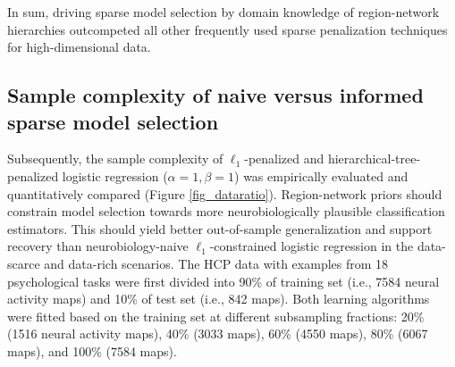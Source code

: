 \documentclass[runningheads,a4paper]{llncs}
\begin{document}
In sum,
driving sparse model selection by domain knowledge of region-network hierarchies
outcompeted all other frequently used sparse penalization techniques
for high-dimensional data.
%
%
\subsection{Sample complexity of naive versus informed sparse model selection}
Subsequently, the sample complexity of
$\ell_1$-penalized and hierarchical-tree-penalized logistic regression
($\alpha = 1, \beta = 1$)
was empirically evaluated and quantitatively compared
(Figure \ref{fig_dataratio}).
Region-network priors should constrain model selection towards more
neurobiologically plausible classification estimators.
This should yield better out-of-sample generalization and
support recovery than
neurobiology-naive $\ell_1$-constrained logistic regression
in the data-scarce and data-rich scenarios.
%
The HCP data with examples from 18
psychological tasks were first divided into
90\% of training set (i.e., 7584 neural activity maps) and
10\% of test set (i.e., 842 maps).
Both learning algorithms were fitted based on the
training set at different subsampling fractions:
20\% (1516 neural activity maps),
40\% (3033 maps),
60\% (4550 maps),
80\% (6067 maps), and
100\% (7584 maps).
\end{document}
